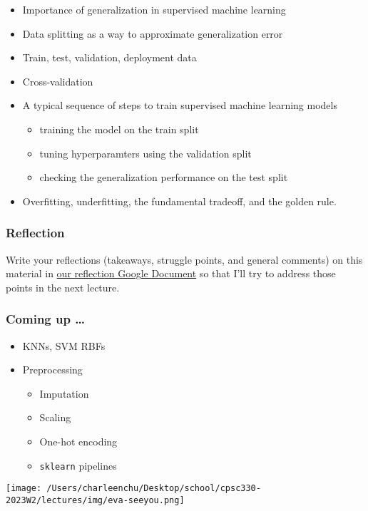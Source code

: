 \documentclass[11pt]{article}
\providecommand{\tightlist}{%
      \setlength{\itemsep}{0pt}\setlength{\parskip}{0pt}}
\begin{document}
\begin{itemize}
\tightlist
\item
  Importance of generalization in supervised machine learning
\item
  Data splitting as a way to approximate generalization error
\item
  Train, test, validation, deployment data
\item
  Cross-validation
\item
  A typical sequence of steps to train supervised machine learning
  models

  \begin{itemize}
  \tightlist
  \item
    training the model on the train split
  \item
    tuning hyperparamters using the validation split
  \item
    checking the generalization performance on the test split
  \end{itemize}
\item
  Overfitting, underfitting, the fundamental tradeoff, and the golden
  rule.
\end{itemize}

    \subsubsection{Reflection}\label{reflection}

Write your reflections (takeaways, struggle points, and general
comments) on this material in
\href{https://docs.google.com/document/d/1LWiR7dzzNNwOJR72LWgC25priLXGdyxEq9FWBia3wmw/edit?usp=sharing}{our
reflection Google Document} so that I'll try to address those points in
the next lecture.

    \subsubsection{Coming up \ldots{}}\label{coming-up}

\begin{itemize}
\tightlist
\item
  KNNs, SVM RBFs
\item
  Preprocessing

  \begin{itemize}
  \tightlist
  \item
    Imputation
  \item
    Scaling
  \item
    One-hot encoding
  \item
    \texttt{sklearn} pipelines
  \end{itemize}
\end{itemize}

    \texttt{[image: /Users/charleenchu/Desktop/school/cpsc330-2023W2/lectures/img/eva-seeyou.png]}


    
    
    
\end{document}

